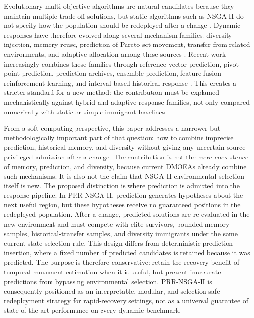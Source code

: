 \documentclass[1p,times]{elsarticle}
\begin{document}
Evolutionary multi-objective algorithms are natural candidates because they maintain multiple trade-off solutions, but static algorithms such as NSGA-II do not specify how the population should be redeployed after a change \cite{deb2002}. Dynamic responses have therefore evolved along several mechanism families: diversity injection, memory reuse, prediction of Pareto-set movement, transfer from related environments, and adaptive allocation among these sources \cite{yang2008,zhou2014,arms2022,peng2024ab,mstl2022}. Recent work increasingly combines these families through reference-vector prediction, pivot-point prediction, prediction archives, ensemble prediction, feature-fusion reinforcement learning, and interval-based historical response \cite{zheng2023rvcp,pivot2023hppds,wang2024dmpa,ensemble2024,li2025mffrl,ou2026hcips}. This creates a stricter standard for a new method: the contribution must be explained mechanistically against hybrid and adaptive response families, not only compared numerically with static or simple immigrant baselines.

From a soft-computing perspective, this paper addresses a narrower but methodologically important part of that question: how to combine imprecise prediction, historical memory, and diversity without giving any uncertain source privileged admission after a change. The contribution is not the mere coexistence of memory, prediction, and diversity, because current DMOEAs already combine such mechanisms. It is also not the claim that NSGA-II environmental selection itself is new. The proposed distinction is where prediction is admitted into the response pipeline. In PRR-NSGA-II, prediction generates hypotheses about the next useful region, but these hypotheses receive no guaranteed positions in the redeployed population. After a change, predicted solutions are re-evaluated in the new environment and must compete with elite survivors, bounded-memory samples, historical-transfer samples, and diversity immigrants under the same current-state selection rule. This design differs from deterministic prediction insertion, where a fixed number of predicted candidates is retained because it was predicted. The purpose is therefore conservative: retain the recovery benefit of temporal movement estimation when it is useful, but prevent inaccurate predictions from bypassing environmental selection. PRR-NSGA-II is consequently positioned as an interpretable, modular, and selection-safe redeployment strategy for rapid-recovery settings, not as a universal guarantee of state-of-the-art performance on every dynamic benchmark.
\end{document}
